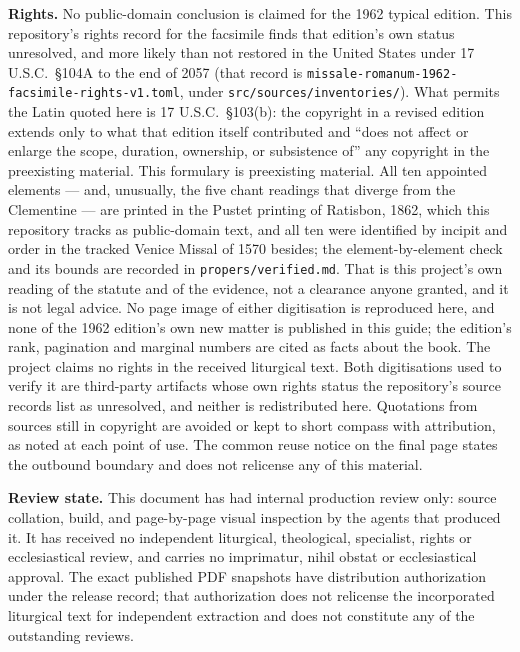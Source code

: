\textbf{Rights.} No public-domain conclusion is claimed for the 1962 typical
edition. This repository's rights record for the facsimile finds that edition's
own status unresolved, and more likely than not restored in the United States
under 17 U.S.C.\ \S104A to the end of 2057 (that record is
\texttt{missale-romanum-1962-facsimile-rights-v1.toml}, under
\texttt{src/sources/inventories/}). What permits the Latin quoted here is
17 U.S.C.\ \S103(b): the copyright in a revised edition extends only to what
that edition itself contributed and ``does not affect or enlarge the scope,
duration, ownership, or subsistence of'' any copyright in the preexisting
material. This formulary is preexisting material. All ten appointed elements
--- and, unusually, the five chant readings that diverge from the Clementine
--- are printed in the Pustet printing of Ratisbon, 1862, which this repository
tracks as public-domain text, and all ten were identified by incipit and order
in the tracked Venice Missal of 1570 besides; the element-by-element check and
its bounds are recorded in \texttt{propers/verified.md}. That is this project's
own reading of the statute and of the evidence, not a clearance anyone granted,
and it is not legal advice. No page image of either digitisation is reproduced
here, and none of the 1962 edition's own new matter is published in this guide;
the edition's rank, pagination and marginal numbers are cited as facts about
the book. The project claims no rights in the received liturgical text. Both
digitisations used to verify it are third-party artifacts whose own rights
status the repository's source records list as unresolved, and neither is
redistributed here. Quotations from sources still in copyright are avoided or
kept to short compass with attribution, as noted at each point of use. The
common reuse notice on the final page states the outbound boundary and does not
relicense any of this material.

\textbf{Review state.} This document has had internal production review only:
source collation, build, and page-by-page visual inspection by the agents that
produced it. It has received no independent liturgical, theological,
specialist, rights or ecclesiastical review, and carries no imprimatur, nihil
obstat or ecclesiastical approval. The exact published PDF snapshots have
distribution authorization under the release record; that authorization does
not relicense the incorporated liturgical text for independent extraction and
does not constitute any of the outstanding reviews.

